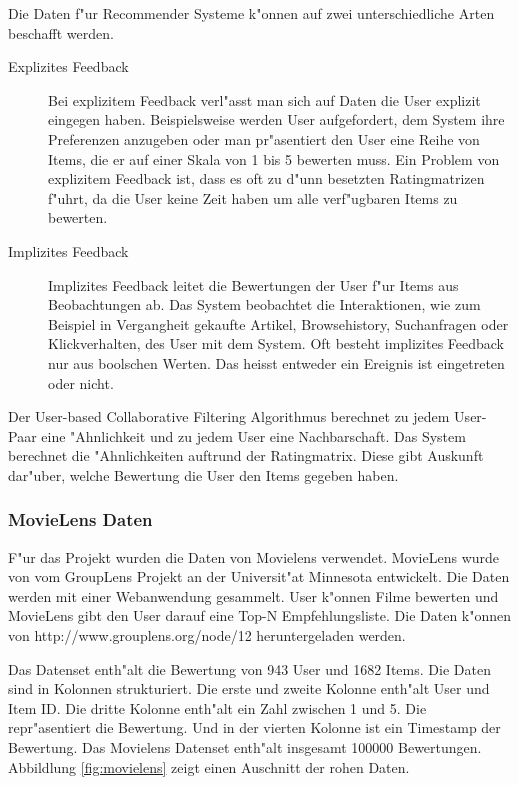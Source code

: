 \documentclass[a4paper, 12pt]{article}
\begin{document}
Die Daten f"ur Recommender Systeme k"onnen auf zwei unterschiedliche Arten beschafft werden.

\begin{description}
\item[Explizites Feedback] Bei explizitem Feedback verl"asst man sich auf Daten die User explizit eingegen haben. Beispielsweise werden User aufgefordert, dem System ihre Preferenzen anzugeben oder man pr"asentiert den User eine Reihe von Items, die er auf einer Skala von 1 bis 5 bewerten muss. Ein Problem von explizitem Feedback ist, dass es oft zu d"unn besetzten Ratingmatrizen f"uhrt, da die User keine Zeit haben um alle verf"ugbaren Items zu bewerten.
\item[Implizites Feedback] Implizites Feedback leitet die Bewertungen der User f"ur Items aus Beobachtungen ab. Das System beobachtet die Interaktionen, wie zum Beispiel in Vergangheit gekaufte Artikel, Browsehistory, Suchanfragen oder Klickverhalten, des User mit dem System. Oft besteht implizites Feedback nur aus boolschen Werten. Das heisst entweder ein Ereignis ist eingetreten oder nicht.
\end{description}

 Der User-based Collaborative Filtering Algorithmus berechnet zu jedem User-Paar eine "Ahnlichkeit und zu jedem User eine Nachbarschaft. Das System berechnet die "Ahnlichkeiten auftrund der Ratingmatrix. Diese gibt Auskunft dar"uber, welche Bewertung die User den Items gegeben haben.

\subsubsection{MovieLens Daten}
\label{sec:movielens}

F"ur das Projekt wurden die Daten von Movielens verwendet. MovieLens wurde von vom GroupLens Projekt an der Universit"at Minnesota entwickelt. Die Daten werden mit einer Webanwendung gesammelt. User k"onnen Filme bewerten und MovieLens gibt den User darauf eine Top-N Empfehlungsliste. Die Daten k"onnen von http://www.grouplens.org/node/12 heruntergeladen werden. 

Das Datenset enth"alt die Bewertung von 943 User und 1682 Items. Die Daten sind in Kolonnen strukturiert. Die erste und zweite Kolonne enth"alt User und Item ID. Die dritte Kolonne enth"alt ein Zahl zwischen 1 und 5. Die repr"asentiert die Bewertung. Und in der vierten Kolonne ist ein Timestamp der Bewertung. Das Movielens Datenset enth"alt insgesamt 100000 Bewertungen. Abbildlung \ref{fig:movielens} zeigt einen Auschnitt der rohen Daten.
\end{document}
